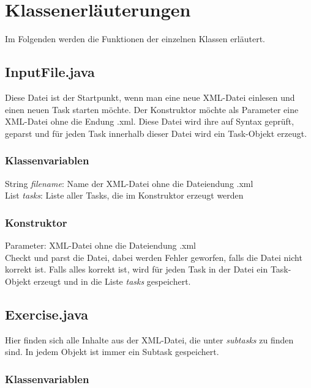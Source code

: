\documentclass[11pt]{report}
\begin{document}


\chapter{Klassenerläuterungen}

Im Folgenden werden die Funktionen der einzelnen Klassen erläutert.

\section{InputFile.java}

Diese Datei ist der Startpunkt, wenn man eine neue XML-Datei einlesen und einen neuen Task starten möchte. Der Konstruktor möchte als Parameter eine XML-Datei ohne die Endung \grqq .xml\grqq. Diese Datei wird ihre auf Syntax geprüft, geparst und für jeden Task innerhalb dieser Datei wird ein Task-Objekt erzeugt.

\subsection*{Klassenvariablen}

String \textit{filename}: Name der XML-Datei ohne die Dateiendung \grqq .xml\grqq\  \\
List \textit{tasks}: Liste aller Tasks, die im Konstruktor erzeugt werden

\subsection*{Konstruktor}

Parameter: XML-Datei ohne die Dateiendung \grqq .xml\grqq\ \\
Checkt und parst die Datei, dabei werden Fehler geworfen, falls die Datei nicht korrekt ist.
Falls alles korrekt ist, wird für jeden Task in der Datei ein Task-Objekt erzeugt und in die Liste \textit{tasks} gespeichert.

\section{Exercise.java}

Hier finden sich alle Inhalte aus der XML-Datei, die unter \textit{subtasks} zu finden sind. In jedem Objekt ist immer ein Subtask gespeichert.

\subsection*{Klassenvariablen}
\end{document}
